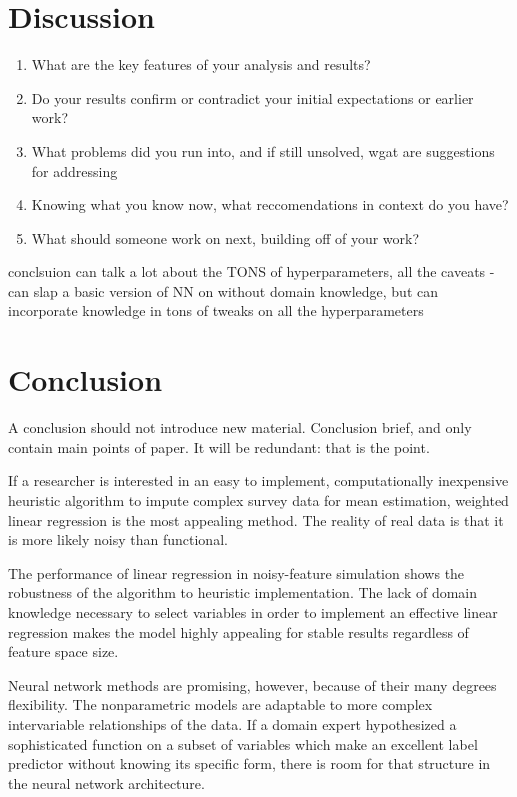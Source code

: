\documentclass[12pt,twoside]{reedthesis}
\providecommand{\tightlist}{%
  \setlength{\itemsep}{0pt}\setlength{\parskip}{0pt}}
\begin{document}
\section{Discussion}\label{discussion}
\begin{enumerate}
\def\labelenumi{\arabic{enumi}.}
\tightlist
\item
  What are the key features of your analysis and results?
\item
  Do your results confirm or contradict your initial expectations or
  earlier work?
\item
  What problems did you run into, and if still unsolved, wgat are
  suggestions for addressing
\item
  Knowing what you know now, what reccomendations in context do you
  have?
\item
  What should someone work on next, building off of your work?
\end{enumerate}
conclsuion can talk a lot about the TONS of hyperparameters, all the
caveats - can slap a basic version of NN on without domain knowledge,
but can incorporate knowledge in tons of tweaks on all the
hyperparameters

\section{Conclusion}\label{conclusion-1}

A conclusion should not introduce new material. Conclusion brief, and
only contain main points of paper. It will be redundant: that is the
point.

If a researcher is interested in an easy to implement, computationally
inexpensive heuristic algorithm to impute complex survey data for mean
estimation, weighted linear regression is the most appealing method. The
reality of real data is that it is more likely noisy than functional.

The performance of linear regression in noisy-feature simulation shows
the robustness of the algorithm to heuristic implementation. The lack of
domain knowledge necessary to select variables in order to implement an
effective linear regression makes the model highly appealing for stable
results regardless of feature space size.

Neural network methods are promising, however, because of their many
degrees flexibility. The nonparametric models are adaptable to more
complex intervariable relationships of the data. If a domain expert
hypothesized a sophisticated function on a subset of variables which
make an excellent label predictor without knowing its specific form,
there is room for that structure in the neural network architecture.
\end{document}
